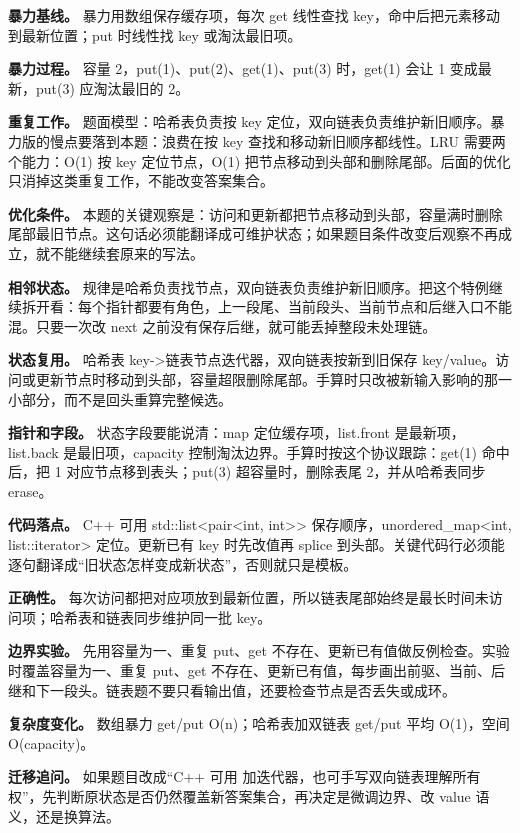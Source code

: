 \textbf{暴力基线。} 暴力用数组保存缓存项，每次 get 线性查找 key，命中后把元素移动到最新位置；put 时线性找 key 或淘汰最旧项。

\textbf{暴力过程。} 容量 2，put(1)、put(2)、get(1)、put(3) 时，get(1) 会让 1 变成最新，put(3) 应淘汰最旧的 2。

\textbf{重复工作。} 题面模型：哈希表负责按 key 定位，双向链表负责维护新旧顺序。暴力版的慢点要落到本题：浪费在按 key 查找和移动新旧顺序都线性。LRU 需要两个能力：O(1) 按 key 定位节点，O(1) 把节点移动到头部和删除尾部。后面的优化只消掉这类重复工作，不能改变答案集合。

\textbf{优化条件。} 本题的关键观察是：访问和更新都把节点移动到头部，容量满时删除尾部最旧节点。这句话必须能翻译成可维护状态；如果题目条件改变后观察不再成立，就不能继续套原来的写法。

\textbf{相邻状态。} 规律是哈希负责找节点，双向链表负责维护新旧顺序。把这个特例继续拆开看：每个指针都要有角色，上一段尾、当前段头、当前节点和后继入口不能混。只要一次改 next 之前没有保存后继，就可能丢掉整段未处理链。

\textbf{状态复用。} 哈希表 key->链表节点迭代器，双向链表按新到旧保存 key/value。访问或更新节点时移动到头部，容量超限删除尾部。手算时只改被新输入影响的那一小部分，而不是回头重算完整候选。

\textbf{指针和字段。} 状态字段要能说清：map 定位缓存项，list.front 是最新项，list.back 是最旧项，capacity 控制淘汰边界。手算时按这个协议跟踪：get(1) 命中后，把 1 对应节点移到表头；put(3) 超容量时，删除表尾 2，并从哈希表同步 erase。

\textbf{代码落点。} C++ 可用 std::list<pair<int, int>> 保存顺序，unordered\_map<int, list::iterator> 定位。更新已有 key 时先改值再 splice 到头部。关键代码行必须能逐句翻译成“旧状态怎样变成新状态”，否则就只是模板。

\textbf{正确性。} 每次访问都把对应项放到最新位置，所以链表尾部始终是最长时间未访问项；哈希表和链表同步维护同一批 key。

\textbf{边界实验。} 先用容量为一、重复 put、get 不存在、更新已有值做反例检查。实验时覆盖容量为一、重复 put、get 不存在、更新已有值，每步画出前驱、当前、后继和下一段头。链表题不要只看输出值，还要检查节点是否丢失或成环。

\textbf{复杂度变化。} 数组暴力 get/put O(n)；哈希表加双链表 get/put 平均 O(1)，空间 O(capacity)。

\textbf{迁移追问。} 如果题目改成“C++ 可用  加迭代器，也可手写双向链表理解所有权”，先判断原状态是否仍然覆盖新答案集合，再决定是微调边界、改 value 语义，还是换算法。

